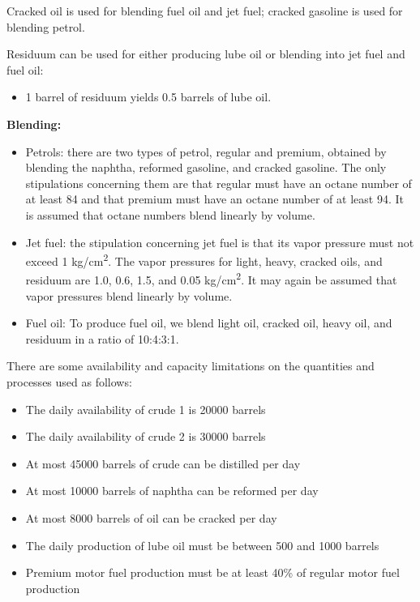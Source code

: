 \documentclass[11pt]{article}
\begin{document}
Cracked oil is used for blending fuel oil and jet fuel; cracked gasoline is used for blending petrol.

Residuum can be used for either producing lube oil or blending into jet fuel and fuel oil:
\begin{itemize}
    \item 1 barrel of residuum yields 0.5 barrels of lube oil.
\end{itemize}

\textbf{Blending:}
\begin{itemize}
    \item Petrols: there are two types of petrol, regular and premium, obtained by blending the naphtha, reformed gasoline, and cracked gasoline. The only stipulations concerning them are that regular must have an octane number of at least 84 and that premium must have an octane number of at least 94. It is assumed that octane numbers blend linearly by volume.
    \item Jet fuel: the stipulation concerning jet fuel is that its vapor pressure must not exceed 1 kg/cm\textsuperscript{2}. The vapor pressures for light, heavy, cracked oils, and residuum are 1.0, 0.6, 1.5, and 0.05 kg/cm\textsuperscript{2}. It may again be assumed that vapor pressures blend linearly by volume.
    \item Fuel oil: To produce fuel oil, we blend light oil, cracked oil, heavy oil, and residuum in a ratio of 10:4:3:1.
\end{itemize}

There are some availability and capacity limitations on the quantities and processes used as follows:
\begin{itemize}
    \item The daily availability of crude 1 is 20000 barrels
    \item The daily availability of crude 2 is 30000 barrels
    \item At most 45000 barrels of crude can be distilled per day
    \item At most 10000 barrels of naphtha can be reformed per day
    \item At most 8000 barrels of oil can be cracked per day
    \item The daily production of lube oil must be between 500 and 1000 barrels
    \item Premium motor fuel production must be at least 40\% of regular motor fuel production
\end{itemize}
\end{document}
